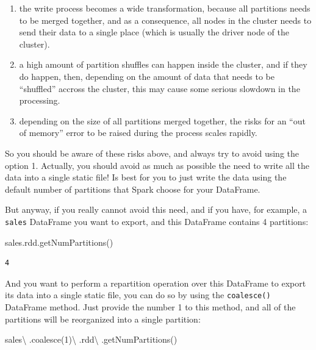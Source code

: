 \documentclass[
  11pt,
  letterpaper,
  DIV=11,
  numbers=noendperiod]{scrreprt}
\newenvironment{Shaded}{\begin{snugshade}}{\end{snugshade}}
\newcommand{\DecValTok}[1]{\textcolor[rgb]{0.68,0.00,0.00}{#1}}
\newcommand{\NormalTok}[1]{\textcolor[rgb]{0.00,0.23,0.31}{#1}}
\newcommand{\OperatorTok}[1]{\textcolor[rgb]{0.37,0.37,0.37}{#1}}
\begin{document}
\begin{enumerate}
\def\labelenumi{\arabic{enumi}.}
\item
  the write process becomes a wide transformation, because all
  partitions needs to be merged together, and as a consequence, all
  nodes in the cluster needs to send their data to a single place (which
  is usually the driver node of the cluster).
\item
  a high amount of partition shuffles can happen inside the cluster, and
  if they do happen, then, depending on the amount of data that needs to
  be ``shuffled'' accross the cluster, this may cause some serious
  slowdown in the processing.
\item
  depending on the size of all partitions merged together, the risks for
  an ``out of memory'' error to be raised during the process scales
  rapidly.
\end{enumerate}

So you should be aware of these risks above, and always try to avoid
using the option 1. Actually, you should avoid as much as possible the
need to write all the data into a single static file! Is best for you to
just write the data using the default number of partitions that Spark
choose for your DataFrame.

But anyway, if you really cannot avoid this need, and if you have, for
example, a \texttt{sales} DataFrame you want to export, and this
DataFrame contains 4 partitions:

\begin{Shaded}
\begin{Highlighting}[]
\NormalTok{sales.rdd.getNumPartitions()}
\end{Highlighting}
\end{Shaded}

\begin{verbatim}
4
\end{verbatim}

And you want to perform a repartition operation over this DataFrame to
export its data into a single static file, you can do so by using the
\texttt{coalesce()} DataFrame method. Just provide the number 1 to this
method, and all of the partitions will be reorganized into a single
partition:

\begin{Shaded}
\begin{Highlighting}[]
\NormalTok{sales}\OperatorTok{\textbackslash{}}
\NormalTok{    .coalesce(}\DecValTok{1}\NormalTok{)}\OperatorTok{\textbackslash{}}
\NormalTok{    .rdd}\OperatorTok{\textbackslash{}}
\NormalTok{    .getNumPartitions()}
\end{Highlighting}
\end{Shaded}
\end{document}
